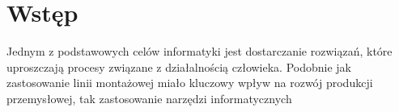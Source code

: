 \chapter*{Wstęp}
		
Jednym z podstawowych celów informatyki jest dostarczanie rozwiązań, które uproszczają procesy związane z działalnością człowieka. Podobnie jak zastosowanie linii montażowej miało kluczowy wpływ na rozwój produkcji przemysłowej\cite{Boney96}, tak zastosowanie narzędzi informatycznych 